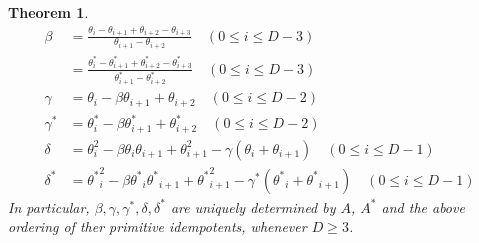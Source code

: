 \documentclass[
]{book}
\newtheorem{theorem}{Theorem}[chapter]
\theoremstyle{definition}
\theoremstyle{definition}
\theoremstyle{definition}
\theoremstyle{definition}
\theoremstyle{remark}
\begin{document}
\begin{theorem}
\begin{align}
\beta & = \frac{\theta_i-\theta_{i+1}+\theta_{i+2}-\theta_{i+3}}{\theta_{i+1}-\theta_{i+2}} \quad (0\leq i\leq D-3) \label{eq:beta}\\
& = \frac{\theta^*_i-\theta^*_{i+1}+\theta^*_{i+2}-\theta^*_{i+3}}{\theta^*_{i+1}-\theta^*_{i+2}} \quad (0\leq i\leq D-3) \label{eq:betastar}\\
\gamma & = \theta_i - \beta \theta_{i+1} + \theta_{i+2} \quad (0\leq i\leq D-2) \label{eq:gamma1}\\
\gamma^* & = \theta^*_i - \beta \theta^*_{i+1} + \theta^*_{i+2} \quad (0\leq i\leq D-2) \label{eq:gammastar}\\
\delta & = \theta^2_i - \beta \theta_i\theta_{i+1} + \theta^2_{i+1} - \gamma(\theta_i + \theta_{i+1}) \quad (0\leq i\leq D-1) \label{eq:delta}\\
\delta^* & = {\theta^*}^2_i - \beta {\theta^*}_i{\theta^*}_{i+1} + {\theta^*}^2_{i+1} - \gamma^*({\theta^*}_i + {\theta^*}_{i+1}) \quad (0\leq i\leq D-1) \label{eq:deltastar}
\end{align}
In particular, \(\beta, \gamma, \gamma^*, \delta, \delta^*\) are uniquely determined by \(A\), \(A^*\) and the above ordering of ther primitive idempotents, whenever \(D\geq 3\).
\end{theorem}
\end{document}
